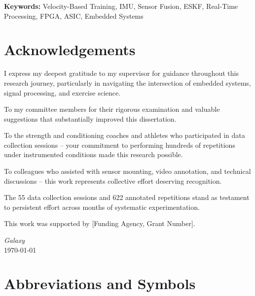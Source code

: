 \documentclass[12pt,a4paper,oneside]{book}
\begin{document}
\medskip
\noindent\textbf{Keywords:} Velocity-Based Training, IMU, Sensor Fusion, ESKF, Real-Time Processing, FPGA, ASIC, Embedded Systems

\chapter*{Acknowledgements}

I express my deepest gratitude to my supervisor for guidance throughout this research journey, particularly in navigating the intersection of embedded systems, signal processing, and exercise science.

To my committee members for their rigorous examination and valuable suggestions that substantially improved this dissertation.

To the strength and conditioning coaches and athletes who participated in data collection sessions -- your commitment to performing hundreds of repetitions under instrumented conditions made this research possible.

To colleagues who assisted with sensor mounting, video annotation, and technical discussions -- this work represents collective effort deserving recognition.

The 55 data collection sessions and 622 annotated repetitions stand as testament to persistent effort across months of systematic experimentation.

This work was supported by [Funding Agency, Grant Number].

\vspace{1cm}
\begin{center}
\textit{Galaxy}\\
\today
\end{center}

\setcounter{page}{5}
\pagestyle{plain}
\tableofcontents
\newpage

\listoffigures
\newpage

\listoftables
\newpage

\chapter*{Abbreviations and Symbols}
\end{document}
